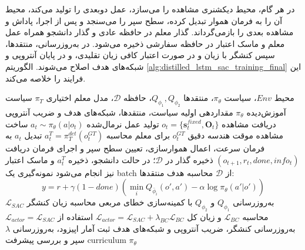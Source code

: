 در هر گام، محیط دیکشنری مشاهده را می‌سازد،  عمل دوبعدی را تولید می‌کند، محیط آن را به فرمان هموار تبدیل کرده، سطح سپر را می‌سنجد و پس از اجرا، پاداش و مشاهده بعدی را بازمی‌گرداند. گذار معلم در حافظه عادی و گذار دانشجو همراه عمل معلم و ماسک اعتبار در حافظه سفارشی ذخیره می‌شود. در به‌روزرسانی، منتقدها، سپس کنشگر با زیان  و در صورت اعتبار کافی زیان تقلیدی، و در پایان آنتروپی و شبکه‌های هدف اصلاح می‌شوند. الگوریتم \ref{alg:distilled_lstm_sac_training_final} این فرایند را خلاصه می‌کند.

\begin{algorithm}[htbp]
	\footnotesize
	\caption{فرآیند آموزش عامل  با سپر غیرفعال و لنگر رفتاری معلم}
	\label{alg:distilled_lstm_sac_training_final}
	\begin{algorithmic}[1]
		\REQUIRE محیط \(Env\)، سیاست \(\pi_\theta\)، منتقدها \(Q_{\phi_1},Q_{\phi_2}\)، حافظه \(\mathcal{D}\)، مدل معلم اختیاری \(\pi_T\)
		\ENSURE سیاست آموزش‌دیده \(\pi_\theta\)
		\STATE مقداردهی اولیه سیاست، منتقدها، شبکه‌های هدف و ضریب آنتروپی
		\STATE دریافت مشاهده \(o_t=\{\mathbf{s}^{fixed}_t,\mathbf{O}_t\}\)
		\STATE تولید عمل نرمال‌شده \(a_t\sim\pi_\theta(a|o_t)\)
		\STATE ساخت مشاهده موقت هندسه دقیق \(o^{GT}_t\) برای معلم
		\STATE محاسبه \(a^T_t=\pi_T^{det}(o^{GT}_t)\)
		\ENDIF
		\STATE تبدیل \(a_t\) به فرمان سرعت، اعمال هموارسازی، تعیین سطح سپر و اجرای فرمان
		\STATE دریافت \((o_{t+1},r_t,done,info_t)\)
		\STATE ذخیره گذار در \(\mathcal{D}\)؛ در حالت دانشجو، ذخیره \(a^T_t\) و ماسک اعتبار نیز انجام می‌شود
		\STATE نمونه‌گیری یک batch از \(\mathcal{D}\)
		\STATE محاسبه هدف منتقدها:
		\[
		y=r+\gamma(1-done)
		\left(
		\min_i Q_{\bar{\phi}_i}(o',a')-
		\alpha\log\pi_\theta(a'|o')
		\right)
		\]
		\STATE به‌روزرسانی \(Q_{\phi_1}\) و \(Q_{\phi_2}\) با کمینه‌سازی خطای مربعی
		\STATE محاسبه زیان کنشگر \(\mathcal{L}_{SAC}\)
		\STATE محاسبه \(\mathcal{L}_{BC}\) و زیان کل \(\mathcal{L}_{actor}=\mathcal{L}_{SAC}+\lambda_{BC}\mathcal{L}_{BC}\)
		\ELSE
		\STATE استفاده از \(\mathcal{L}_{actor}=\mathcal{L}_{SAC}\)
		\ENDIF
		\STATE به‌روزرسانی کنشگر، ضریب آنتروپی و شبکه‌های هدف
		\ENDIF
		\STATE ثبت آمار اپیزود، به‌روزرسانی \(\lambda\) سپر و بررسی پیشرفت curriculum
		\ENDIF
		\ENDFOR
		\RETURN \(\pi_\theta\)
	\end{algorithmic}
\end{algorithm}

